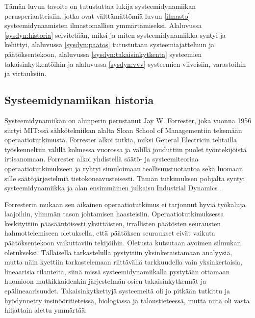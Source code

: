 \documentclass[finnish,12pt,a4paper,pdftex]{article}
\begin{document}
\begin{onehalfspacing}
Tämän luvun tavoite on tutustuttaa lukija systeemidynamiikan perusperiaatteisiin, jotka ovat välttämättömiä luvun \ref{ilmasto} systeemidynaamisten ilmastomallien ymmärtämiseksi. Alaluvussa \ref{sysdyn:historia} selvitetään, miksi ja miten systeemidynamiikka syntyi ja kehittyi, alaluvussa \ref{sysdyn:paatos} tutustutaan systeemiajatteluun ja päätöksentekoon, alaluvussa \ref{sysdyn:takaisinkytkenta} systeemien takaisinkytkentöihin ja alaluvussa \ref{sysdyn:vvv} systeemien viiveisiin, varastoihin ja virtauksiin. 

\subsection{Systeemidynamiikan historia \label{sysdyn:historia}} 


Systeemidynamiikan on alunperin perustanut Jay W. Forrester, joka vuonna 1956 siirtyi MIT:ssä sähkötekniikan alalta Sloan School of Managementiin tekemään operaatiotutkimusta. Forrester alkoi tutkia, miksi General Electricin tehtailla työskenneltiin välillä kolmessa vuorossa ja välillä jouduttiin puolet työntekijöistä irtisanomaan. Forrester alkoi yhdistellä säätö- ja systeemiteoriaa operaatiotutkimukseen ja ryhtyi simuloimaan teollisuustuotantoa sekä luomaan sille säätöjärjestelmiä tietokoneavusteisesti. Tämän tutkimuksen pohjalta syntyi systeemidynamiikka ja alan ensimmäinen julkaisu Industrial Dynamics \cite{Forrester1961}. \cite{Forrester1989} 

Forresterin \cite[s. 398--399]{Forrester1968} mukaan sen aikainen operaatiotutkimus ei tarjonnut hyviä työkaluja laajoihin, ylimmän tason johtamisen haasteisiin. Operaatiotutkimuksessa keskityttiin pääsääntöisesti yksittäisten, irrallisten päätösten seurausten hahmottelemiseen oletuksella, että päätöksen seuraukset eivät vaikuta päätöksentekoon vaikuttaviin tekijöihin. Oletusta kutsutaan avoimen silmukan oletukseksi. Tällaisella tarkastelulla pystyttiin yksinkeraistamaan analyysiä, mutta näin kyettiin tarkastelemaan riittävällä tarkkuudella vain yksinkertaisia, lineaarisia tilanteita, siinä missä systeemidynamiikalla pystytään ottamaan huomioon mutkikkaidenkin järjestelmän osien takaisinkytkennät ja epälineaarisuudet. Takaisinkytkettyjä systeemeitä oli jo pitkään tutkittu ja hyödynnetty insinööritieteissä, biologiassa ja taloustieteessä, mutta niitä oli vasta hiljattain alettu ymmärtää. 


\end{onehalfspacing}
\end{document}
